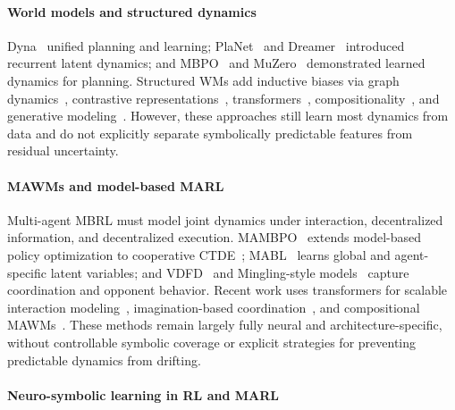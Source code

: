 \documentclass{article}
\theoremstyle{plain}
\theoremstyle{definition}
\theoremstyle{remark}
\begin{document}
\paragraph{World models and structured dynamics}
Dyna~\cite{sutton1991dyna} unified planning and learning; PlaNet~\cite{hafner2018planet} and Dreamer~\cite{hafner2019dreamer, hafner2020dreamerv2} introduced recurrent latent dynamics; and MBPO~\cite{janner2019mbpo} and MuZero~\cite{schrittwieser2020muzero} demonstrated learned dynamics for planning. Structured WMs add inductive biases via graph dynamics~\cite{zhang2021worldmodelgraph}, contrastive representations~\cite{kipf2020contrastivelearningstructuredworld}, transformers~\cite{chen2022transdreamer, micheli2023transformers}, compositionality~\cite{zhang2024combo}, and generative modeling~\cite{ajay2022conditional}. However, these approaches still learn most dynamics from data and do not explicitly separate symbolically predictable features from residual uncertainty.

\paragraph{MAWMs and model-based MARL}

Multi-agent MBRL must model joint dynamics under interaction, decentralized information, and decentralized execution. MAMBPO~\cite{willemsen2021mambpo} extends model-based policy optimization to cooperative CTDE~\cite{lowe2017multi}; MABL~\cite{Venugopal2024MABL} learns global and agent-specific latent variables; and VDFD~\cite{wang2025} and Mingling-style models~\cite{Xu2022mingling,Yuxiaopeng2022modelbased,nekoei2023dealing} capture coordination and opponent behavior. Recent work uses transformers for scalable interaction modeling~\cite{zhang2025decentralized, deihima2025transformer}, imagination-based coordination~\cite{yang2025acting}, and compositional MAWMs~\cite{zhang2024combo}. These methods remain largely fully neural and architecture-specific, without controllable symbolic coverage or explicit strategies for preventing predictable dynamics from drifting.

\paragraph{Neuro-symbolic learning in RL and MARL}
\end{document}

